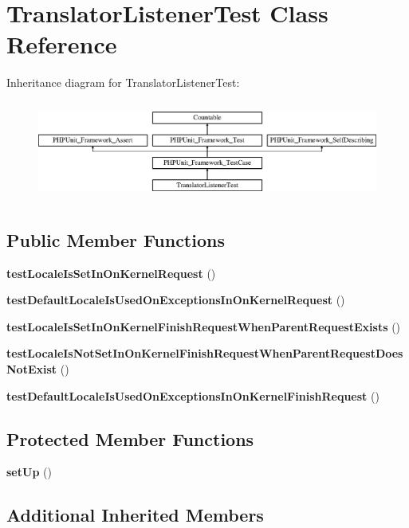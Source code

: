 \section{Translator\+Listener\+Test Class Reference}
\label{class_symfony_1_1_component_1_1_http_kernel_1_1_tests_1_1_event_listener_1_1_translator_listener_test}
Inheritance diagram for Translator\+Listener\+Test\+:\begin{figure}[H]
\begin{center}
\leavevmode
\includegraphics[height=3.303835cm]{class_symfony_1_1_component_1_1_http_kernel_1_1_tests_1_1_event_listener_1_1_translator_listener_test}
\end{center}
\end{figure}
\subsection*{Public Member Functions}
\begin{DoxyCompactItemize}
\item 
{\bf test\+Locale\+Is\+Set\+In\+On\+Kernel\+Request} ()
\item 
{\bf test\+Default\+Locale\+Is\+Used\+On\+Exceptions\+In\+On\+Kernel\+Request} ()
\item 
{\bf test\+Locale\+Is\+Set\+In\+On\+Kernel\+Finish\+Request\+When\+Parent\+Request\+Exists} ()
\item 
{\bf test\+Locale\+Is\+Not\+Set\+In\+On\+Kernel\+Finish\+Request\+When\+Parent\+Request\+Does\+Not\+Exist} ()
\item 
{\bf test\+Default\+Locale\+Is\+Used\+On\+Exceptions\+In\+On\+Kernel\+Finish\+Request} ()
\end{DoxyCompactItemize}
\subsection*{Protected Member Functions}
\begin{DoxyCompactItemize}
\item 
{\bf set\+Up} ()
\end{DoxyCompactItemize}
\subsection*{Additional Inherited Members}


